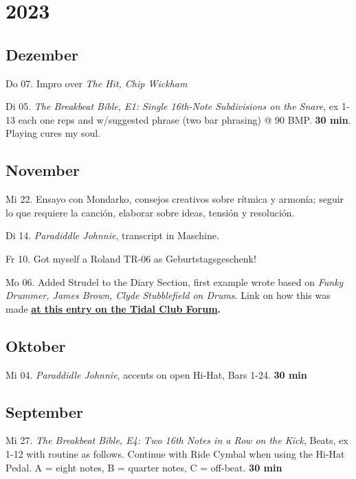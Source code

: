 \documentclass[
]{book}
\begin{document}
\section*{2023}\label{diary-2023}

\subsection*{Dezember}\label{dezember-2023}

Do 07. Impro over \emph{The Hit, Chip Wickham}

Di 05. \emph{The Breakbeat Bible, E1: Single 16th-Note Subdivisions on the Snare}, ex 1-13 each one reps and w/suggested phrase (two bar phrasing) @ 90 BMP. \textbf{30 min}. Playing cures my soul.

\subsection*{November}\label{november-2023}

Mi 22. Ensayo con Mondarko, consejos creativos sobre rítmica y armonía; seguir lo que requiere la canción, elaborar sobre ideas, tensión y resolución.

Di 14. \emph{Paradiddle Johnnie}, transcript in Maschine.

Fr 10. Got myself a Roland TR-06 as Geburtstagsgeschenk!

Mo 06. Added Strudel to the Diary Section, first example wrote based on \emph{Funky Drummer, James Brown, Clyde Stubblefield on Drums}. Link on how this was made \textbf{\href{https://club.tidalcycles.org/t/drum-diary/4931?u=isaacmedina}{at this entry on the Tidal Club Forum}.}

\subsection*{Oktober}\label{oktober-2023}

Mi 04. \emph{Paraddidle Johnnie}, accents on open Hi-Hat, Bars 1-24. \textbf{30 min}

\subsection*{September}\label{september-2023}

Mi 27. \emph{The Breakbeat Bible, E4: Two 16th Notes in a Row on the Kick}, Beats, ex 1-12 with routine as follows. Continue with Ride Cymbal when using the Hi-Hat Pedal. A = eight notes, B = quarter notes, C = off-beat. \textbf{30 min}
\end{document}
